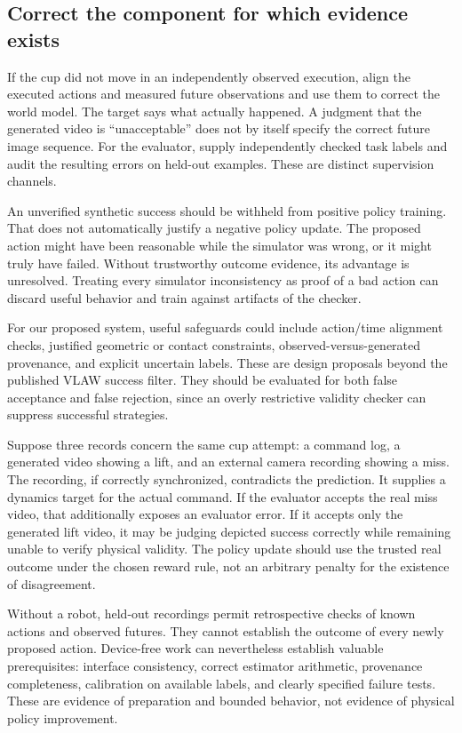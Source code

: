 \subsection{Correct the component for which evidence exists}
If the cup did not move in an independently observed execution, align the executed actions and measured future observations and use them to correct the world model. The target says what actually happened. A judgment that the generated video is ``unacceptable'' does not by itself specify the correct future image sequence. For the evaluator, supply independently checked task labels and audit the resulting errors on held-out examples. These are distinct supervision channels.

An unverified synthetic success should be withheld from positive policy training. That does not automatically justify a negative policy update. The proposed action might have been reasonable while the simulator was wrong, or it might truly have failed. Without trustworthy outcome evidence, its advantage is unresolved. Treating every simulator inconsistency as proof of a bad action can discard useful behavior and train against artifacts of the checker.

For our proposed system, useful safeguards could include action/time alignment checks, justified geometric or contact constraints, observed-versus-generated provenance, and explicit uncertain labels. These are design proposals beyond the published VLAW success filter. They should be evaluated for both false acceptance and false rejection, since an overly restrictive validity checker can suppress successful strategies.

Suppose three records concern the same cup attempt: a command log, a generated video showing a lift, and an external camera recording showing a miss. The recording, if correctly synchronized, contradicts the prediction. It supplies a dynamics target for the actual command. If the evaluator accepts the real miss video, that additionally exposes an evaluator error. If it accepts only the generated lift video, it may be judging depicted success correctly while remaining unable to verify physical validity. The policy update should use the trusted real outcome under the chosen reward rule, not an arbitrary penalty for the existence of disagreement.

Without a robot, held-out recordings permit retrospective checks of known actions and observed futures. They cannot establish the outcome of every newly proposed action. Device-free work can nevertheless establish valuable prerequisites: interface consistency, correct estimator arithmetic, provenance completeness, calibration on available labels, and clearly specified failure tests. These are evidence of preparation and bounded behavior, not evidence of physical policy improvement.

